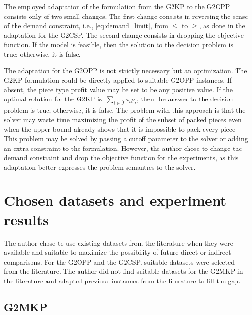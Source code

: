 The employed adaptation of the formulation from the G2KP to the G2OPP consists only of two small changes.
The first change consists in reversing the sense of the demand constraint, i.e., \cref{eq:demand_limit}, from \(\leq\) to \(\geq\), as done in the adaptation for the G2CSP. %
The second change consists in dropping the objective function.
If the model is feasible, then the solution to the decision problem is true; otherwise, it is false.

The adaptation for the G2OPP is not strictly necessary but an optimization.
The G2KP formulation could be directly applied to suitable G2OPP instances.
If absent, the piece type profit value may be set to be any positive value.
If the optimal solution for the G2KP is~\(\sum_{i\in\bar{J}} u_i p_i\), then the answer to the decision problem is true; otherwise, it is false.
The problem with this approach is that the solver may waste time maximizing the profit of the subset of packed pieces even when the upper bound already shows that it is impossible to pack every piece.
This problem may be solved by passing a cutoff parameter to the solver or adding an extra constraint to the formulation.
However, the author chose to change the demand constraint and drop the objective function for the experiments, as this adaptation better expresses the problem semantics to the solver.

\section{Chosen datasets and experiment results}

The author chose to use existing datasets from the literature when they were available and suitable to maximize the possibility of future direct or indirect comparisons.
For the G2OPP and the G2CSP, suitable datasets were selected from the literature.
The author did not find suitable datasets for the G2MKP in the literature and adapted previous instances from the literature to fill the gap.

\subsection{G2MKP}

